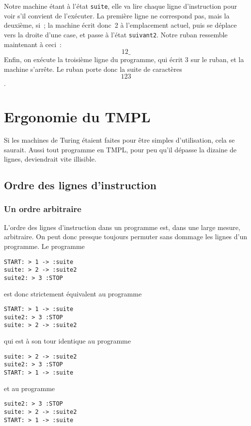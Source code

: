 \documentclass[a4paper, 11pt]{report}
\begin{document}
\par

Notre machine étant à l'état \texttt{suite}, elle va lire chaque ligne
d'instruction pour voir s'il convient de l'exécuter. La première ligne
ne correspond pas, mais la deuxième, si~; la machine écrit donc~2 à
l'emplacement actuel, puis se déplace vers la droite d'une case, et
passe à l'état \texttt{suivant2}. Notre ruban ressemble maintenant à
ceci~: $$12\_$$ Enfin, on exécute la troisième ligne du programme, qui
écrit 3 sur le ruban, et la machine s'arrête. Le ruban porte donc la
suite de caractères $$123$$.

\par


\chapter{Ergonomie du TMPL}

Si les machines de Turing étaient faites pour être simples
d'utilisation, cela se saurait. Aussi tout programme en TMPL, pour peu
qu'il dépasse la dizaine de lignes, deviendrait vite illisible.


\section{Ordre des lignes d'instruction}

\subsection{Un ordre arbitraire}

L'ordre des lignes d'instruction dans un programme est, dans une large
mesure, arbitraire. On peut donc presque toujours permuter sans dommage
les lignes d'un programme. Le programme

\begin{verbatim}
START: > 1 -> :suite
suite: > 2 -> :suite2
suite2: > 3 :STOP
\end{verbatim}
est donc strictement équivalent au programme
\begin{verbatim}
START: > 1 -> :suite
suite2: > 3 :STOP
suite: > 2 -> :suite2
\end{verbatim}
qui est à son tour identique au programme
\begin{verbatim}
suite: > 2 -> :suite2
suite2: > 3 :STOP
START: > 1 -> :suite
\end{verbatim}
et au programme
\begin{verbatim}
suite2: > 3 :STOP
suite: > 2 -> :suite2
START: > 1 -> :suite
\end{verbatim}
\end{document}
